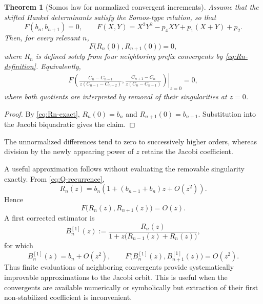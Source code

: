 \documentclass[11pt]{article}
\newtheorem{theorem}{Theorem}
\theoremstyle{remark}
\begin{document}
\begin{theorem}[Somos law for normalized convergent increments]
Assume that the shifted Hankel determinants satisfy the Somos-type relation,
so that
\[
 F(b_n,b_{n+1})=0,
 \qquad
 F(X,Y)=X^2Y^2-p_4XY+p_1(X+Y)+p_2.
\]
Then, for every relevant $n$,
\begin{equation}
 F\bigl(R_n(0),R_{n+1}(0)\bigr)=0,
 \label{eq:Somos-R-zero}
\end{equation}
where $R_n$ is defined solely from four neighboring prefix convergents by
\eqref{eq:Rn-definition}.  Equivalently,
\begin{multline}
 \left.
 F\left(
 \frac{C_n-C_{n-1}}{z(C_{n-1}-C_{n-2})},
 \frac{C_{n+1}-C_n}{z(C_n-C_{n-1})}
 \right)\right|_{z=0}=0,
 \label{eq:Somos-convergent-increments}
\end{multline}
where both quotients are interpreted by removal of their singularities at
$z=0$.
\end{theorem}

\begin{proof}
By \eqref{eq:Rn-exact}, $R_n(0)=b_n$ and
$R_{n+1}(0)=b_{n+1}$.  Substitution into the Jacobi biquadratic gives the
claim.
\end{proof}

The unnormalized differences tend to zero to successively higher orders,
whereas division by the newly appearing power of $z$ retains the Jacobi
coefficient.

A useful approximation follows without evaluating the removable singularity
exactly.  From \eqref{eq:Q-recurrence},
\begin{equation}
 R_n(z)=b_n\left(1+(b_{n-1}+b_n)z+O(z^2)\right).
 \label{eq:Rn-first-order}
\end{equation}
Hence
\begin{equation}
 F\bigl(R_n(z),R_{n+1}(z)\bigr)=O(z).
 \label{eq:Somos-approx-first}
\end{equation}
A first corrected estimator is
\begin{equation}
 B_n^{[1]}(z):=
 \frac{R_n(z)}{1+z\bigl(R_{n-1}(z)+R_n(z)\bigr)},
 \label{eq:corrected-estimator}
\end{equation}
for which
\begin{equation}
 B_n^{[1]}(z)=b_n+O(z^2),\qquad
 F\bigl(B_n^{[1]}(z),B_{n+1}^{[1]}(z)\bigr)=O(z^2).
 \label{eq:corrected-order}
\end{equation}
Thus finite evaluations of neighboring convergents provide systematically
improvable approximations to the Jacobi orbit.  This is useful when the
convergents are available numerically or symbolically but extraction of their
first non-stabilized coefficient is inconvenient.
\end{document}
